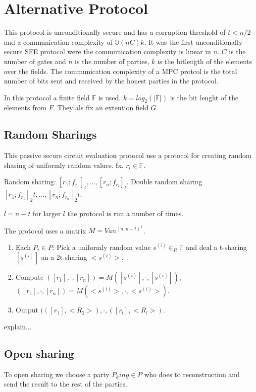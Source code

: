 \section{Alternative Protocol}
This protocol is unconditionally secure and has a corruption threshold of $t<n/2$ and a communication complexity of $\mathbb{O}(nC)k$. It was the first unconditionally secure SFE protocol were the communication complexity is linear in $n$. $C$ is the number of gates and $n$ is the number of parties, $k$ is the bitlength of the elements over the fields. The communication complexity of a MPC protcol is the total number of bits sent and received by the honest parties in the protocol.

In this protocol a finite field $\mathbb{F}$ is used. $k=log_2(|\mathbb{F}|)$ is the bit lenght of the elements from $F$. They als fix an extention field $G$.

\subsection{Random Sharings}
This passive secure circuit evaluation protocol use a protocol for creating random sharing of uniformly random values. fx. $r_l \in \mathbb{F}$.

Random sharing: $[r_1;f_{r_1}]_t, \dots, [r_n;f_{r_l}]_t$. Double random sharing $[r_1;f_{r_1}]_2t, \dots,  [r_n;f_{r_n}]_2t$.



$l=n-t$ for larger $l$ the protocol is run a number of times. 

The protocol uses a matrix $M=Van^(n,n-t)^T$.


\begin{enumerate}
    \item Each $P_i \in P$: Pick a uniformly random value $s^{(i)}\in_R\mathbb{F}$ and deal a t-sharing $[s^{(i)}]$ an a 2t-sharing  $<s^{(i)}>$.
    \item Compute $([r_1],\cdot,[r_n])=M([s^{(i)}],\cdot,[s^{(i)}])$,  $([r_1],\cdot,[r_n])=M(<s^{(i)}>,\cdot,<s^{(i)}>)$.
    \item Output $(([r_1], <R_2>),\cdot, ([r_l], <R_l>)$.
\end{enumerate}

explain...



\subsection{Open sharing}To open sharing we choose a party $P_king \in P$ who does to reconstruction and send the result to the rest of the parties.

